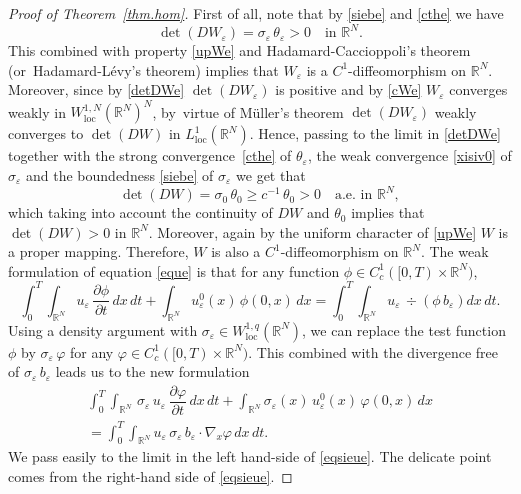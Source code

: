 \documentclass[11pt]{article}
\newcommand{\loc}{\mathrm{loc}}
\let \ph \varphi
\def \RR {\mathbb R}
\theoremstyle{plain}
\theoremstyle{definition}
\numberwithin{equation}{section}
\begin{document}
\begin{proof}[Proof of Theorem~\ref{thm.hom}]
First of all, note that by \eqref{siebe} and \eqref{cthe} we have
\begin{equation}\label{detDWe}
\det (DW_\varepsilon)=\sigma_\varepsilon\,\theta_\varepsilon>0\quad\mbox{in }\RR^N.
\end{equation}
This combined with property \eqref{upWe} and Hadamard-Caccioppoli's theorem \cite{Cac} (or~Hada\-mard-Lévy's theorem) implies that $W_\varepsilon$ is a $C^1$-diffeomorphism on $\RR^N$. Moreover, since by \eqref{detDWe} $\det(DW_\varepsilon)$ is positive and by \eqref{cWe} $W_\varepsilon$ converges weakly in $W^{1,N}_\loc(\RR^N)^N$, by~virtue of Müller's theorem \cite{Mul} $\det(DW_\varepsilon)$ weakly converges to $\det(DW)$ in $L^1_\loc(\RR^N)$. Hence, passing to the limit in \eqref{detDWe} together with the strong convergence~\eqref{cthe} of $\theta_\varepsilon$, the weak convergence \eqref{xisiv0} of $\sigma_\varepsilon$ and the boundedness \eqref{siebe} of $\sigma_\varepsilon$ we get that
\begin{equation}\label{detDW}
\det (DW)=\sigma_0\,\theta_0\geq c^{-1}\,\theta_0>0\quad\mbox{a.e. in }\RR^N,
\end{equation}
which taking into account the continuity of $DW$ and $\theta_0$ implies that $\det (DW)>0$ in $\RR^N$.
Moreover, again by the uniform character of \eqref{upWe} $W$ is a proper mapping.
Therefore, $W$ is also a $C^1$-diffeomorphism on $\RR^N$.
The weak formulation of equation \eqref{eque} is that for any function $\phi\in C^1_c([0,T)\times\RR^N)$,
\begin{equation}\label{weque}
\int_0^T\!\!\int_{\RR^N}u_\varepsilon\,\dfrac{\partial\phi}{\partial t}\,dx\,dt+\int_{\RR^N}u_\varepsilon^0(x)\,\phi(0,x)\,dx=\int_0^T\!\!\int_{\RR^N}u_\varepsilon\,\div\left(\phi\,b_\varepsilon\right)dx\,dt.
\end{equation}
Using a density argument with $\sigma_\varepsilon\in W^{1,q}_\loc(\RR^N)$, we can replace the test function $\phi$ by $\sigma_\varepsilon\,\ph$ for any $\ph\in C^1_c([0,T)\times\RR^N)$. This combined with the divergence free of $\sigma_\varepsilon\,b_\varepsilon$ leads us to the new formulation
\begin{multline}\label{eqsieue}
\int_0^T\!\!\int_{\RR^N}\,\sigma_\varepsilon\,u_\varepsilon\,\dfrac{\partial\ph}{\partial t}\,dx\,dt+\int_{\RR^N}\sigma_\varepsilon(x)\,u_\varepsilon^0(x)\,\ph(0,x)\,dx\\[-8pt]
=\int_0^T\!\!\int_{\RR^N}u_\varepsilon\,\sigma_\varepsilon\,b_\varepsilon\cdot\nabla_x\ph\,dx\,dt.
\end{multline}
We pass easily to the limit in the left hand-side of \eqref{eqsieue}. The delicate point comes from the right-hand side of \eqref{eqsieue}.


\end{proof}
\end{document}
